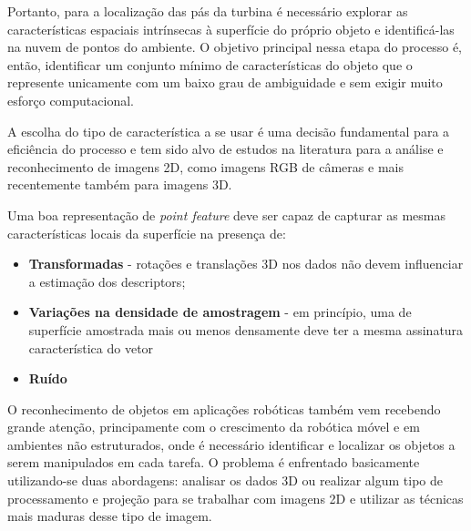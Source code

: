 Portanto, para a localização das pás da turbina é
necessário explorar as características espaciais intrínsecas à superfície do
próprio objeto e identificá-las na nuvem de pontos do ambiente. O objetivo
principal nessa etapa do processo é, então, identificar um conjunto mínimo de
características do objeto que o represente unicamente com um baixo grau
de ambiguidade e sem exigir muito esforço computacional. 

A escolha do tipo de característica a se usar é uma decisão fundamental para a
eficiência do processo e tem sido alvo de estudos na literatura para a análise
e reconhecimento de imagens 2D, como imagens RGB de câmeras e mais recentemente
também para imagens 3D. 

Uma boa representação de \textit{point feature} deve ser capaz de capturar as
mesmas características locais da superfície na presença de:

\begin{itemize}
  \item \textbf{Transformadas} -  rotações e translações 3D nos dados não devem
  influenciar a estimação dos descriptors;
  \item \textbf{Variações na densidade de amostragem} - em princípio, uma de
  superfície amostrada mais ou menos densamente deve ter a mesma assinatura característica do vetor
  \item \textbf{Ruído}
\end{itemize}

O reconhecimento de objetos em aplicações robóticas também vem recebendo
grande atenção, principamente com o crescimento da robótica móvel e em ambientes
não estruturados, onde é necessário identificar e localizar os objetos a serem
manipulados em cada tarefa. O problema é enfrentado basicamente utilizando-se
duas abordagens: analisar os dados 3D ou realizar algum tipo de processamento e
projeção para se trabalhar com imagens 2D e utilizar as técnicas mais maduras
desse tipo de imagem.

